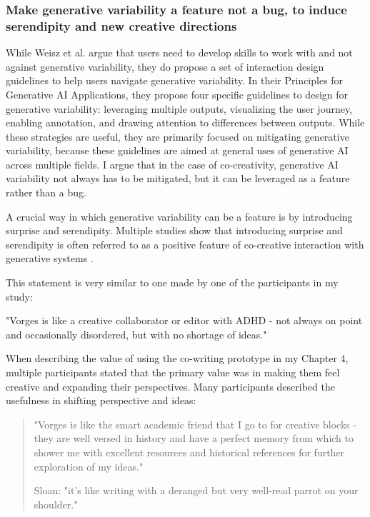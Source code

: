 \subsubsection{Make generative variability a feature not a bug, to induce serendipity and new creative directions}

While Weisz et al. \cite{Weisz2024-io} argue that users need to develop skills to work with and not against generative variability, they do propose a set of interaction design guidelines to help users navigate generative variability. In their Principles for Generative AI Applications, they propose four specific guidelines to design for generative variability: leveraging multiple outputs, visualizing the user journey, enabling annotation, and drawing attention to differences between outputs. While these strategies are useful, they are primarily focused on mitigating generative variability, because these guidelines are aimed at general uses of generative AI across multiple fields. I argue that in the case of co-creativity, generative AI variability not always has to be mitigated, but it can be leveraged as a feature rather than a bug.

A crucial way in which generative variability can be a feature is by introducing surprise and serendipity. Multiple studies show that introducing surprise and serendipity is often referred to as a positive feature of co-creative interaction with generative systems \cite{Lawton2023-tb, Chiou2023-vr, Louie2020-aq, Moruzzi2022-gp, Park2024-gw, Koch2020-gx}.

This statement is very similar to one made by one of the participants in my study:

"Vorges is like a creative collaborator or editor with ADHD - not always on point and occasionally disordered, but with no shortage of ideas."

When describing the value of using the co-writing prototype in my Chapter 4, multiple participants stated that the primary value was in making them feel creative and expanding their perspectives. Many participants described the usefulness in shifting perspective and ideas:

\begin{quote}
"Vorges is like the smart academic friend that I go to for creative blocks - they are well versed in history and have a perfect memory from which to shower me with excellent resources and historical references for further exploration of my ideas."

Sloan: "it’s like writing with a deranged but very well-read parrot on your shoulder."
\end{quote}

